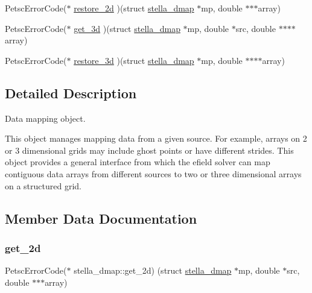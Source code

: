 \begin{DoxyCompactItemize}
Petsc\+Error\+Code($\ast$ \mbox{\hyperlink{structstella__dmap_ada758dbdff7819b7c7d6e89ee84bcde2}{restore\+\_\+2d}} )(struct \mbox{\hyperlink{structstella__dmap}{stella\+\_\+dmap}} $\ast$mp, double $\ast$$\ast$$\ast$array)
\item 
Petsc\+Error\+Code($\ast$ \mbox{\hyperlink{structstella__dmap_a255fe3be53c3cc120d903111569fa168}{get\+\_\+3d}} )(struct \mbox{\hyperlink{structstella__dmap}{stella\+\_\+dmap}} $\ast$mp, double $\ast$src, double $\ast$$\ast$$\ast$$\ast$array)
\item 
Petsc\+Error\+Code($\ast$ \mbox{\hyperlink{structstella__dmap_a6cfc7c2d169e5b575b4e0f999304f092}{restore\+\_\+3d}} )(struct \mbox{\hyperlink{structstella__dmap}{stella\+\_\+dmap}} $\ast$mp, double $\ast$$\ast$$\ast$$\ast$array)
\end{DoxyCompactItemize}


\subsection{Detailed Description}
Data mapping object. 

This object manages mapping data from a given source. For example, arrays on 2 or 3 dimensional grids may include ghost points or have different strides. This object provides a general interface from which the efield solver can map contiguous data arrays from different sources to two or three dimensional arrays on a structured grid. 

\subsection{Member Data Documentation}
\mbox{\label{structstella__dmap_a66a98f3b85ce77dbfdfbfc72040c6e3c}} 
\subsubsection{\texorpdfstring{get\+\_\+2d}{get\_2d}}
{\footnotesize\ttfamily Petsc\+Error\+Code($\ast$ stella\+\_\+dmap\+::get\+\_\+2d) (struct \mbox{\hyperlink{structstella__dmap}{stella\+\_\+dmap}} $\ast$mp, double $\ast$src, double $\ast$$\ast$$\ast$array)}

\mbox{\label{structstella__dmap_a255fe3be53c3cc120d903111569fa168}} 
